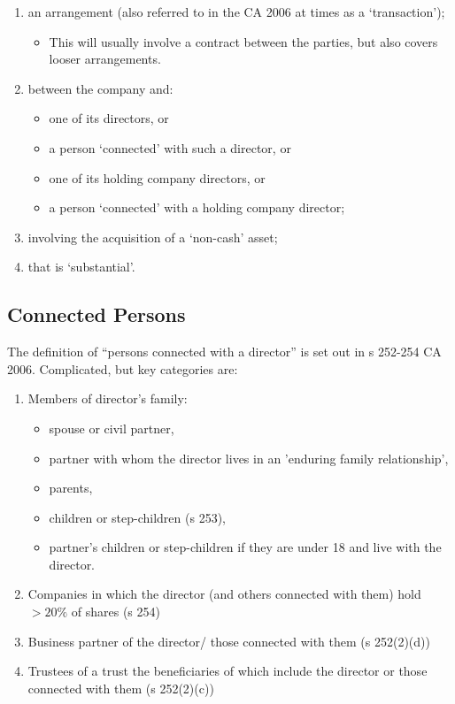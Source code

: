 \documentclass[
]{article}
\providecommand{\tightlist}{%
  \setlength{\itemsep}{0pt}\setlength{\parskip}{0pt}}
\begin{document}
\begin{enumerate}
\tightlist
\item
  an arrangement (also referred to in the CA 2006 at times as a
  `transaction');

  \begin{itemize}
  \tightlist
  \item
    This will usually involve a contract between the parties, but also
    covers looser arrangements.
  \end{itemize}
\item
  between the company and:

  \begin{itemize}
  \tightlist
  \item
    one of its directors, or
  \item
    a person `connected' with such a director, or
  \item
    one of its holding company directors, or
  \item
    a person `connected' with a holding company director;
  \end{itemize}
\item
  involving the acquisition of a `non-cash' asset;
\item
  that is `substantial'.
\end{enumerate}

\hypertarget{connected-persons}{%
\subsection{Connected Persons}\label{connected-persons}}

The definition of ``persons connected with a director'' is set out in s
252-254 CA 2006. Complicated, but key categories are:

\begin{enumerate}
\tightlist
\item
  Members of director's family:

  \begin{itemize}
  \tightlist
  \item
    spouse or civil partner,
  \item
    partner with whom the director lives in an 'enduring family
    relationship',
  \item
    parents,
  \item
    children or step-children (s 253),
  \item
    partner's children or step-children if they are under 18 and live
    with the director.
  \end{itemize}
\item
  Companies in which the director (and others connected with them) hold
  {\(> 20\%\)} of shares (s 254)
\item
  Business partner of the director/ those connected with them (s
  252(2)(d))
\item
  Trustees of a trust the beneficiaries of which include the director or
  those connected with them (s 252(2)(c))
\end{enumerate}
\end{document}
